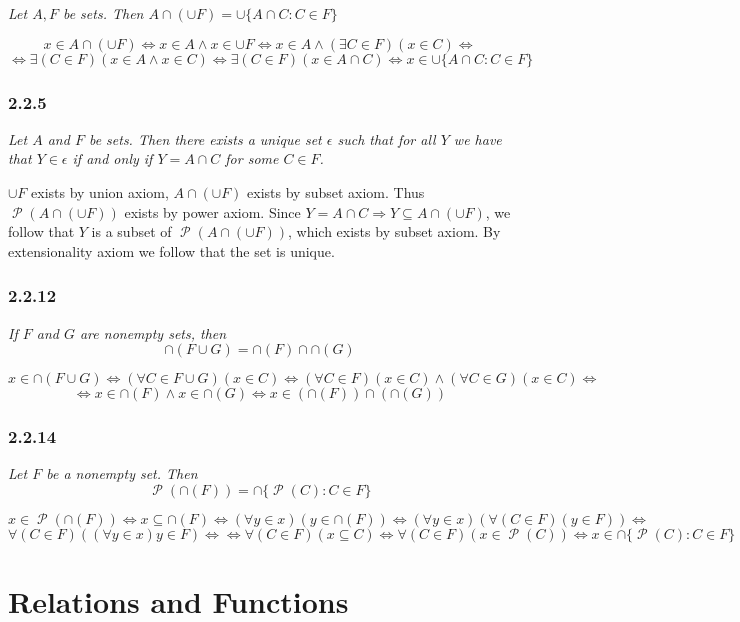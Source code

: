 \documentclass[11pt,oneside,titlepage]{book}
\DeclareMathOperator \pow {\mathcal {P}}
\DeclareMathOperator \lra {\Leftrightarrow}
\DeclareMathOperator \imp {\Rightarrow}
\begin{document}
\textit{Let $A, F$ be sets. Then $A \cap (\cup F) = \cup\{A \cap C: C \in F\}$}

$$x \in A \cap (\cup F) \lra x \in A \land x \in \cup F \lra
x \in A \land  (\exists C \in F)(x \in C) \lra$$
$$ \lra 
\exists(C \in F)(x \in A \land x \in C) \lra
\exists(C \in F)(x \in A \cap C) \lra x \in \cup\{A \cap C: C \in F\}$$


\subsection*{2.2.5}

\textit{Let $A$ and $F$ be sets. Then there exists a unique set $\epsilon$ such that for all
  $Y$ we have that $Y \in \epsilon$ if and only if $Y = A \cap C$ for some $C \in F$.}

$\cup F$ exists by union axiom, $A \cap (\cup F)$ exists by subset axiom. Thus $\pow(A \cap (\cup F))$
exists by power axiom. Since $Y = A \cap C \imp Y \subseteq A \cap (\cup F)$, we follow that
$Y$ is a subset of $\pow(A \cap (\cup F))$, which exists by subset axiom. By extensionality axiom we follow that
the set is unique.

\subsection*{2.2.12}

\textit{If $F$ and $G$ are nonempty sets, then }
$$\cap(F \cup G) = \cap(F) \cap  \cap(G)$$

$$x \in \cap(F \cup G) \lra (\forall C \in F \cup G)(x \in C) \lra (\forall C \in F)(x \in C) \land
(\forall C \in G)(x \in C) \lra $$
$$ \lra x \in \cap(F) \land x \in \cap(G) \lra x \in (\cap(F)) \cap (\cap(G))$$


\subsection*{2.2.14}

\textit{Let $F$ be a nonempty set. Then}
$$\pow(\cap (F)) = \cap\{\pow(C): C \in F\}$$

$$x \in \pow(\cap (F)) \lra x \subseteq \cap (F) \lra (\forall y \in x)(y \in \cap (F)) \lra
(\forall y \in x)(\forall (C \in F) (y \in F)) \lra $$
$$
\forall (C \in F) ( (\forall y \in x) y \in F) \lra
\lra \forall(C \in F)(x \subseteq C) \lra \forall(C \in F)(x \in \pow(C)) \lra x \in  \cap\{\pow(C): C \in F\}$$

\chapter{Relations and Functions}
\end{document}
